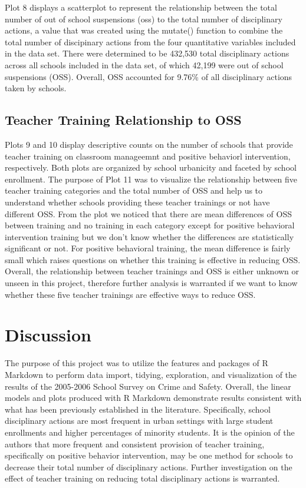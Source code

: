 \documentclass[man]{apa6}
\begin{document}
Plot 8 displays a scatterplot to represent the relationship between the total number of out of school suspensions (oss) to the total number of disciplinary actions, a value that was created using the mutate() function to combine the total number of discipinary actions from the four quantitative variables included in the data set. There were determined to be 432,530 total disciplinary actions across all schools included in the data set, of which 42,199 were out of school suspensions (OSS). Overall, OSS accounted for 9.76\% of all disciplinary actions taken by schools.

\hypertarget{teacher-training-relationship-to-oss-1}{%
\subsection{Teacher Training Relationship to OSS}\label{teacher-training-relationship-to-oss-1}}

Plots 9 and 10 display descriptive counts on the number of schools that provide teacher training on classroom manageemnt and positive behaviorl intervention, respectively. Both plots are organized by school urbanicity and faceted by school enrollment. The purpose of Plot 11 was to visualize the relationship between five teacher training categories and the total number of OSS and help us to understand whether schools providing these teacher trainings or not have different OSS. From the plot we noticed that there are mean differences of OSS between training and no training in each category except for positive behavioral intervention training but we don't know whether the differences are statistically significant or not. For positive behavioral training, the mean difference is fairly small which raises questions on whether this training is effective in reducing OSS. Overall, the relationship between teacher trainings and OSS is either unknown or unseen in this project, therefore further analysis is warranted if we want to know whether these five teacher trainings are effective ways to reduce OSS.

\hypertarget{discussion}{%
\section{Discussion}\label{discussion}}

The purpose of this project was to utilize the features and packages of R Markdown to perform data import, tidying, exploration, and visualization of the results of the 2005-2006 School Survey on Crime and Safety. Overall, the linear models and plots produced with R Markdown demonstrate results consistent with what has been previously established in the literature. Specifically, school disciplinary actions are most frequent in urban settings with large student enrollments and higher percentages of minority students. It is the opinion of the authors that more frequent and consistent provision of teacher training, specifically on positive behavior intervention, may be one method for schools to decrease their total number of disciplinary actions. Further investigation on the effect of teacher training on reducing total disciplinary actions is warranted.
\end{document}
